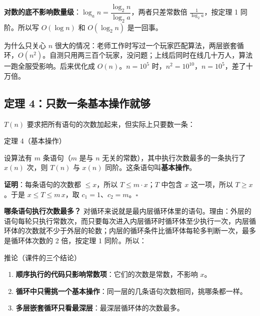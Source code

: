 \documentclass[10.5pt,a4paper,oneside]{article}
\providecommand{\tightlist}{\setlength{\itemsep}{2pt}\setlength{\parskip}{0pt}}
\newcommand{\cuebox}[1]{\leavevmode\llap{\smash{\begin{minipage}[t]{\marginparwidth}\raggedright\small\linespread{1.18}\selectfont #1\end{minipage}}\hspace{\marginparsep}}}
\newcommand{\cuenote}[1]{\cuebox{{\color{wdblue}\bfseries Q\,}\color{wddark}#1}}
\begin{document}
\begin{addbox}

\textbf{对数的底不影响数量级}：\(\log_a n=\dfrac{\log_2 n}{\log_2 a}\)，两者只差常数倍
\(\frac{1}{\log_2 a}\)，按定理 1 同阶。所以写 \(O(\log n)\) 和
\(O(\log_2 n)\) 是一回事。

\end{addbox}

\begin{teacherbox}

为什么只关心 \(n\)
很大的情况：老师工作时写过一个玩家匹配算法，两层嵌套循环，\(O(n^2)\)。自测只用两三百个玩家，没问题；上线后同时在线几十万人，算法一跑全服受影响。后来优化成
\(O(n)\)。\(n=10^5\) 时，\(n^2=10^{10}\)，\(n=10^5\)，差了十万倍。

\end{teacherbox}

\hypertarget{ux5b9aux7406-4ux53eaux6570ux4e00ux6761ux57faux672cux64cdux4f5cux5c31ux591f}{%
\subsection{定理
4：只数一条基本操作就够}\label{ux5b9aux7406-4ux53eaux6570ux4e00ux6761ux57faux672cux64cdux4f5cux5c31ux591f}}


\cuenote{为什么只数一条语句？哪条？}\(T(n)\)
要求把所有语句的次数加起来，但实际上只要数一条：

\begin{thmbox}{定理 4（基本操作）}

设算法有 \(m\) 条语句（\(m\) 是与 \(n\)
无关的常数），其中执行次数最多的一条执行了 \(x(n)\) 次，则 \(T(n)\) 与
\(x(n)\) 同阶。这条语句叫\textbf{基本操作}。

\textbf{证明}：每条语句的次数都 \(\le x\)，所以 \(T\le m\cdot x\)；\(T\)
中包含 \(x\) 这一项，所以 \(T\ge x\)。于是 \(x\le T\le m\,x\)，取
\(c_1=1\)、\(c_2=m\)。\(\square\)

\end{thmbox}

\textbf{哪条语句执行次数最多？}
对循环来说就是最内层循环体里的语句。理由：外层的语句每轮只执行常数次，而只要每次进入内层循环时循环体至少执行一次，内层循环体的次数就不少于外层的轮数；内层的循环条件比循环体每轮多判断一次，最多是循环体次数的
2 倍，按定理 1 同阶。所以：

\begin{thmbox}{推论（课件的三个结论）}

\begin{enumerate}
\def\labelenumi{\arabic{enumi}.}
\tightlist
\item
  \textbf{顺序执行的代码只影响常数项}：它们的次数是常数，不影响 \(x\)。
\item
  \textbf{循环中只需挑一个基本操作}：同一层的几条语句次数相同，挑哪条都一样。
\item
  \textbf{多层嵌套循环只看最深层}：最深层循环体的次数最多。
\end{enumerate}

\end{thmbox}
\end{document}
